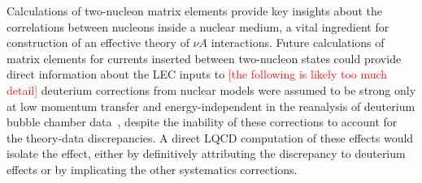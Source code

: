 
Calculations of two-nucleon matrix elements provide key insights
 about the correlations between nucleons inside a nuclear medium,
 a vital ingredient for construction of an effective theory
 of $\nu A$ interactions.
%
Future calculations of matrix elements for currents inserted between
 two-nucleon states could provide direct information about the LEC inputs to 
\textcolor{red}{[the following is likely too much detail]}
 deuterium corrections from nuclear models were assumed to be strong only at low momentum transfer
 and energy-independent in the reanalysis of deuterium bubble chamber data~\cite{Meyer:2016oeg},
 despite the inability of these corrections to account for the theory-data discrepancies.
A direct LQCD computation of these effects would isolate the effect,
 either by definitively attributing the discrepancy to deuterium effects
 or by implicating the other systematics corrections.
